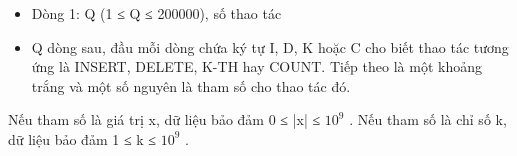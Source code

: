 \begin{itemize}
	\item     Dòng 1: Q (1 ≤ Q ≤ 200000), số thao tác   
	\item     Q dòng sau, đầu mỗi dòng chứa ký tự I, D, K hoặc C cho biết thao tác tương ứng là INSERT, DELETE, K-TH hay COUNT. Tiếp theo là một khoảng trắng và một số nguyên là tham số cho thao tác đó.   
\end{itemize}

   Nếu tham số là giá trị x, dữ liệu bảo đảm 0 ≤ |x| ≤ $10^{9}$   . Nếu tham số là chỉ số k, dữ liệu bảo đảm 1 ≤ k ≤ $10^{9}$   .